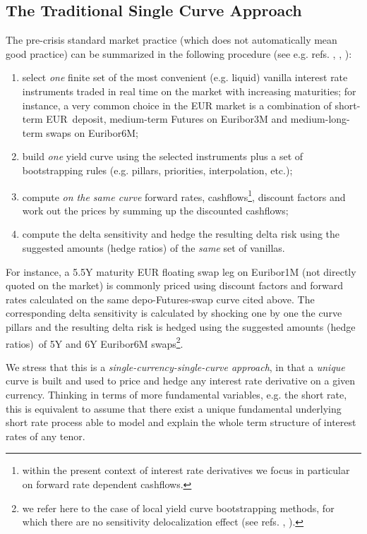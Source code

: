 \documentclass[11pt,reqno]{amsart}
\begin{document}
\subsection{\label{SecSingleCurve}The Traditional Single Curve Approach}
The pre-crisis standard market practice (which does not automatically mean good practice) can be summarized in the following procedure (see e.g. refs. \cite{Ron00}, \cite{HagWes06}, \cite{And07} \cite{HagWes08}):

\begin{enumerate}
\item select \emph{one} finite set of the most convenient (e.g. liquid) vanilla interest rate instruments traded in real time on the market with increasing maturities; for instance, a very common choice in the EUR market is a combination of short-term EUR\ deposit, medium-term Futures on Euribor3M and medium-long-term swaps on Euribor6M;

\item build \emph{one} yield curve using the selected instruments plus a set of bootstrapping rules (e.g. pillars, priorities, interpolation, etc.);

\item compute \emph{on the same curve} forward rates, cashflows\footnote{within the present context of interest rate derivatives we focus in particular on forward rate dependent cashflows.}, discount factors and work out the prices by summing up the discounted cashflows;

\item compute the delta sensitivity and hedge the resulting delta risk using the suggested amounts (hedge ratios) of the \emph{same} set of vanillas.
\end{enumerate}

For instance, a 5.5Y maturity EUR floating swap leg on Euribor1M (not directly quoted on the market) is commonly priced using discount factors and forward rates calculated on the same depo-Futures-swap curve cited above. The corresponding delta sensitivity is calculated by shocking one by one the curve pillars and the resulting delta risk is hedged using the suggested amounts (hedge ratios)\ of 5Y and 6Y Euribor6M swaps\footnote{we refer here to the case of local yield curve bootstrapping methods, for which there are no sensitivity delocalization effect (see refs. \cite{HagWes06}, \cite{And07} \cite{HagWes08}).}.

We stress that this is a \emph{single-currency-single-curve approach}, in that a \emph{unique} curve is built and used to price and hedge any interest rate derivative on a given currency. Thinking in terms of more fundamental variables, e.g. the short rate, this is equivalent to assume that there exist a unique fundamental underlying short rate process able to model and explain the whole term structure of interest rates of any tenor.
\end{document}
